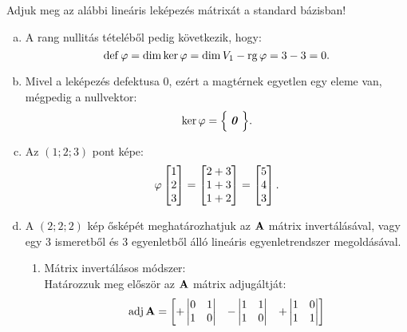 \documentclass[exercise]{math-standalone}
\begin{document}
\begin{exercise}{%
    Adjuk meg az alábbi lineáris leképezés mátrixát a standard bázisban!
  }
{\begin{enumerate}[a)]
            Mivel a mátrix reguláris ($\det \rmat A \neq 0$), ezért rangja maximális
            ($\rg \rmat A = 3$). A leképezés mátrix-reprezentációjának rangja megegyezik
            a leképezés rangjával és a képtér dimenziójával:
            \[
              \rg \rmat A = \rg \varphi = \dim V_2 = 3
              \text.
            \]
      \item A rang nullitás tételéből pedig következik, hogy:
            \[
              \operatorname{def} \varphi = \operatorname{dim} \ker \varphi = \operatorname{dim} V_1 - \operatorname{rg} \varphi = 3 - 3 = 0
              \text.
            \]
      \item Mivel a leképezés defektusa 0, ezért a magtérnek egyetlen egy eleme van,
            mégpedig a nullvektor:
            \[
              \ker \varphi = \Big\{\; \text{\textbf{\textit{0}}} \;\Big\}
              \text.
            \]
      \item Az $(1;2;3)$ pont képe:
            \[
              \varphi \begin{bmatrix}
                1 \\ 2 \\ 3
              \end{bmatrix} = \begin{bmatrix}
                2 + 3 \\
                1 + 3 \\
                1 + 2
              \end{bmatrix} = \begin{bmatrix}
                5 \\ 4 \\3
              \end{bmatrix}
              \text.
            \]
      \item A $(2;2;2)$ kép ősképét meghatározhatjuk az $\mathbf{A}$ mátrix invertálásával,
            vagy egy 3 ismeretből és 3 egyenletből álló lineáris egyenletrendszer
            megoldásával.
            \begin{enumerate}[1)]
              \newcommand\qadj[4]{\begin{vmatrix}#1&#2\\#3&#4\end{vmatrix}}
              \item Mátrix invertálásos módszer: \\[2mm]
                    Határozzuk meg először az $\mathbf{A}$ mátrix adjugáltját:
                    \[
                      \adj \rmat A = \begin{bmatrix}
                        +\qadj{0}{1}{1}{0} & -\qadj{1}{1}{1}{0} & +\qadj{1}{0}{1}{1} \\

\end{bmatrix}\]
\end{enumerate}
\end{enumerate}}
\end{exercise}
\end{document}
